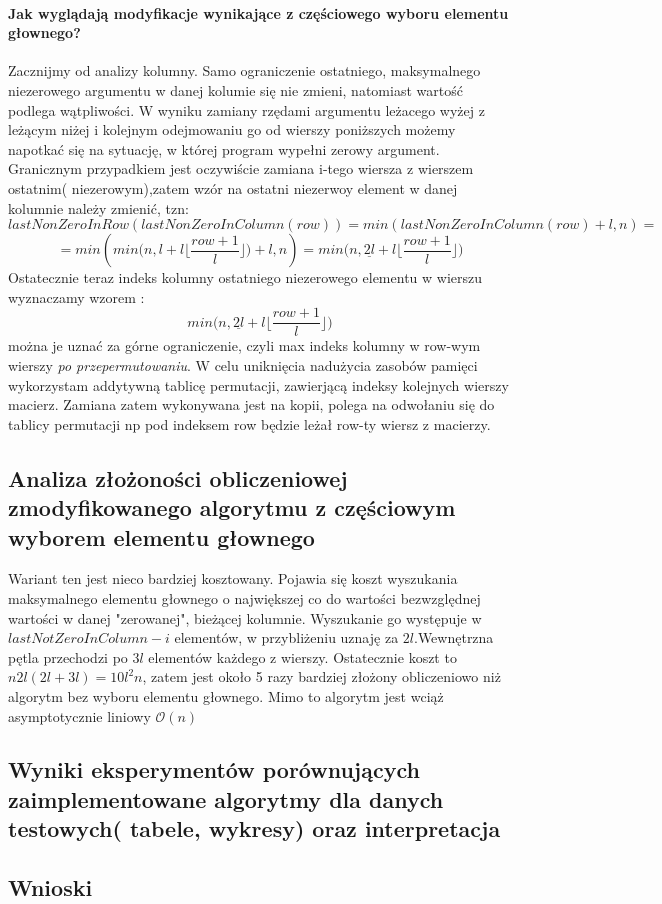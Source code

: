 \documentclass[11pt]{article}
\begin{document}
\begin{flushleft}
\paragraph{Jak wyglądają modyfikacje wynikające z częściowego wyboru elementu głownego?}
Zacznijmy od analizy kolumny. Samo ograniczenie ostatniego, maksymalnego niezerowego argumentu w danej kolumie się nie zmieni, natomiast wartość podlega wątpliwości. W wyniku zamiany rzędami argumentu leżacego wyżej z leżącym niżej i kolejnym odejmowaniu go od wierszy poniższych możemy napotkać się na sytuację, w której program wypełni zerowy argument. Granicznym przypadkiem jest oczywiście zamiana i-tego wiersza z wierszem ostatnim( niezerowym),zatem wzór na ostatni niezerwoy element w danej kolumnie należy zmienić, tzn: $$ lastNonZeroInRow(lastNonZeroInColumn(row))= min(lastNonZeroInColumn(row)+l,n) =
$$
$$ = min(min \Big( n, l+l \Big \lfloor \dfrac{row+1}{l} \Big \rfloor \Big) +l,n) = min \Big( n, \underline{2l}+l \Big \lfloor \dfrac{row+1}{l} \Big \rfloor \Big) $$
Ostatecznie teraz indeks kolumny ostatniego niezerowego elementu w wierszu wyznaczamy wzorem : $$min \Big( n, \underline{2l}+l \Big \lfloor \dfrac{row+1}{l} \Big \rfloor \Big)$$ można je uznać za górne ograniczenie, czyli max indeks kolumny w row-wym wierszy \textsl{po przepermutowaniu}.
W celu uniknięcia nadużycia zasobów pamięci wykorzystam addytywną tablicę permutacji, zawierjącą indeksy kolejnych wierszy macierz. Zamiana zatem wykonywana jest na kopii, polega na odwołaniu się do tablicy permutacji np pod indeksem row będzie leżał row-ty wiersz z macierzy. 
\subsection{Analiza złożoności obliczeniowej zmodyfikowanego algorytmu z częściowym wyborem elementu głownego}
Wariant ten jest nieco bardziej kosztowany. Pojawia się koszt wyszukania maksymalnego elementu głownego o największej co do wartości bezwzględnej wartości w danej "zerowanej", bieżącej kolumnie. Wyszukanie go występuje w $lastNotZeroInColumn - i$ elementów, w przybliżeniu uznaję za $2l$.Wewnętrzna pętla przechodzi po $3l$ elementów każdego z wierszy. Ostatecznie koszt to $n2l(2l+3l)=10l^2n$, zatem jest około 5 razy bardziej złożony obliczeniowo niż algorytm bez wyboru elementu głownego. Mimo to algorytm jest wciąż asymptotycznie liniowy $\mathcal{O}(n)$
\subsection{Wyniki eksperymentów porównujących zaimplementowane algorytmy dla danych testowych( tabele, wykresy) oraz interpretacja}
\subsection{Wnioski}
\end{flushleft}
\end{document}
